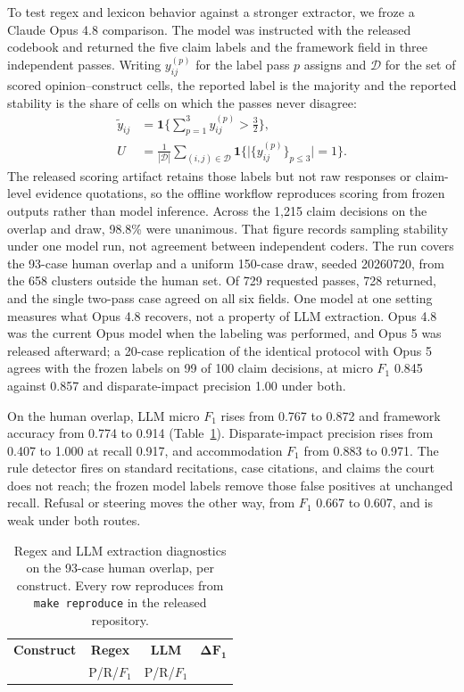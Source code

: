 \documentclass[11pt]{article}
\begin{document}
To test regex and lexicon behavior against a stronger extractor, we froze a Claude Opus 4.8 comparison. The model was instructed with the released codebook and returned the five claim labels and the framework field in three independent passes. Writing $y^{(p)}_{ij}$ for the label pass $p$ assigns and $\mathcal{D}$ for the set of scored opinion--construct cells, the reported label is the majority and the reported stability is the share of cells on which the passes never disagree:
\begin{align}
\tilde{y}_{ij} &= \mathbf{1}\Big\{\textstyle\sum_{p=1}^{3} y^{(p)}_{ij} > \tfrac{3}{2}\Big\},\label{eq:vote}\\
U &= \frac{1}{|\mathcal{D}|}\sum_{(i,j)\in\mathcal{D}}\mathbf{1}\big\{\big|\{y^{(p)}_{ij}\}_{p\le 3}\big| = 1\big\}.\label{eq:unanimity}
\end{align} The released scoring artifact retains those labels but not raw responses or claim-level evidence quotations, so the offline workflow reproduces scoring from frozen outputs rather than model inference. Across the 1,215 claim decisions on the overlap and draw, 98.8\% were unanimous. That figure records sampling stability under one model run, not agreement between independent coders. The run covers the 93-case human overlap and a uniform 150-case draw, seeded 20260720, from the 658 clusters outside the human set. Of 729 requested passes, 728 returned, and the single two-pass case agreed on all six fields. One model at one setting measures what Opus 4.8 recovers, not a property of LLM extraction. Opus 4.8 was the current Opus model when the labeling was performed, and Opus 5 was released afterward; a 20-case replication of the identical protocol with Opus 5 agrees with the frozen labels on 99 of 100 claim decisions, at micro $F_1$ 0.845 against 0.857 and disparate-impact precision 1.00 under both.

On the human overlap, LLM micro $F_1$ rises from 0.767 to 0.872 and framework accuracy from 0.774 to 0.914 (Table~\ref{tab:llm}). Disparate-impact precision rises from 0.407 to 1.000 at recall 0.917, and accommodation $F_1$ from 0.883 to 0.971. The rule detector fires on standard recitations, case citations, and claims the court does not reach; the frozen model labels remove those false positives at unchanged recall. Refusal or steering moves the other way, from $F_1$ 0.667 to 0.607, and is weak under both routes.

\begin{table}[H]
\centering\small
\setlength{\tabcolsep}{3.4pt}
\begin{tabular}{lccr}
\toprule
\textbf{Construct} & \textbf{Regex} & \textbf{LLM} & $\boldsymbol{\Delta F_1}$ \\
 & \scriptsize P/R/$F_1$ & \scriptsize P/R/$F_1$ & \\
\midrule

\end{tabular}
\caption{Regex and LLM extraction diagnostics on the 93-case human overlap, per construct. Every row reproduces from \texttt{make reproduce} in the released repository.}
\label{tab:llm}
\end{table}
\end{document}
